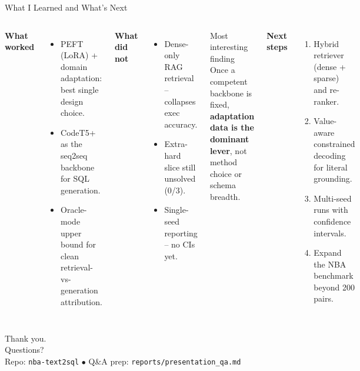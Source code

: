 \documentclass[aspectratio=169,11pt]{beamer}
\begin{document}
\begin{frame}{What I Learned and What's Next}
  \begin{columns}[T,onlytextwidth]
      \textbf{What worked}
      \begin{itemize}
        \item PEFT (LoRA) + domain adaptation: best single design choice.
        \item CodeT5+ as the seq2seq backbone for SQL generation.
        \item Oracle-mode upper bound for clean retrieval-vs-generation
              attribution.
      \end{itemize}

      \textbf{What did not}
      \begin{itemize}
        \item Dense-only RAG retrieval -- collapses exec accuracy.
        \item Extra-hard slice still unsolved (0/3).
        \item Single-seed reporting -- no CIs yet.
      \end{itemize}
      \begin{alertblock}{Most interesting finding}
        Once a competent backbone is fixed, \textbf{adaptation data is
        the dominant lever}, not method choice or schema breadth.
      \end{alertblock}
      \textbf{Next steps}
      \begin{enumerate}
        \item Hybrid retriever (dense + sparse) and re-ranker.
        \item Value-aware constrained decoding for literal grounding.
        \item Multi-seed runs with confidence intervals.
        \item Expand the NBA benchmark beyond 200 pairs.
      \end{enumerate}
  \end{columns}
\end{frame}

\begin{frame}[standout]
  Thank you.\\[6pt]
  {\normalsize Questions?}\\[10pt]
  {\footnotesize Repo: \texttt{nba-text2sql} \quad$\bullet$\quad
   Q\&A prep: \texttt{reports/presentation\_qa.md}}
\end{frame}
\end{document}
